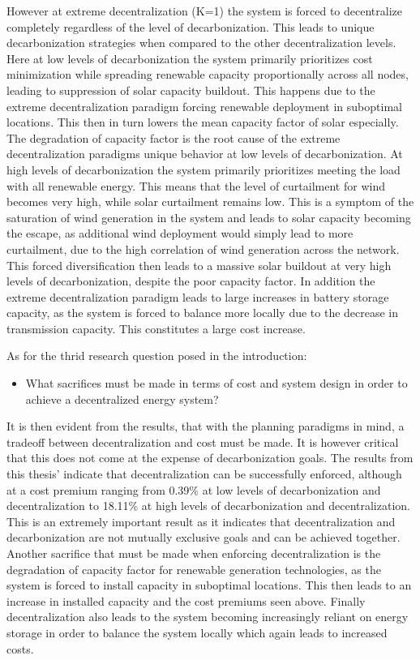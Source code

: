 \documentclass[preprint,12pt,nopreprintline]{elsarticle}
\begin{document}
\medskip
\noindent
However at extreme decentralization (K=1) the system is forced to decentralize completely regardless of the level of decarbonization. This leads to unique decarbonization strategies when compared to the other decentralization levels. Here at low levels of decarbonization the system primarily prioritizes cost minimization while spreading renewable capacity proportionally across all nodes, leading to suppression of solar capacity buildout. This happens due to the extreme decentralization paradigm forcing renewable deployment in suboptimal locations. This then in turn lowers the mean capacity factor of solar especially. The degradation of capacity factor is the root cause of the extreme decentralization paradigms unique behavior at low levels of decarbonization. At high levels of decarbonization the system primarily prioritizes meeting the load with all renewable energy. This means that the level of curtailment for wind becomes very high, while solar curtailment remains low. This is a symptom of the saturation of wind generation in the system and leads to solar capacity becoming the escape, as additional wind deployment would simply lead to more curtailment, due to the high correlation of wind generation across the network. This forced diversification then leads to a massive solar buildout at very high levels of decarbonization, despite the poor capacity factor. In addition the extreme decentralization paradigm leads to large increases in battery storage capacity, as the system is forced to balance more locally due to the decrease in transmission capacity. This constitutes a large cost increase.

\medskip
\noindent
As for the thrid research question posed in the introduction:

\begin{itemize}
  \item What sacrifices must be made in terms of cost and system design in
order to achieve a decentralized energy system?
\end{itemize}

\medskip
\noindent
It is then evident from the results, that with the planning paradigms in mind, a tradeoff between decentralization and cost must be made. It is however critical that this does not come at the expense of decarbonization goals. The results from this thesis' indicate that decentralization can be successfully enforced, although at a cost premium ranging from 0.39\% at low levels of decarbonization and decentralization to 18.11\% at high levels of decarbonization and decentralization. This is an extremely important result as it indicates that decentralization and decarbonization are not mutually exclusive goals and can be achieved together. Another sacrifice that must be made when enforcing decentralization is the degradation of capacity factor for renewable generation technologies, as the system is forced to install capacity in suboptimal locations. This then leads to an increase in installed capacity and the cost premiums seen above. Finally decentralization also leads to the system becoming increasingly reliant on energy storage in order to balance the system locally which again leads to increased costs.
\end{document}
